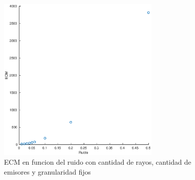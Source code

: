 \begin{figure}[H]
	\centering	\includegraphics[width=0.7\textwidth]{img/ruido_ecm}
	\caption{ECM en funcion del ruido con cantidad de rayos, cantidad de emisores y granularidad fijos}
	\label{fig:ruido_ecm}
\end{figure}